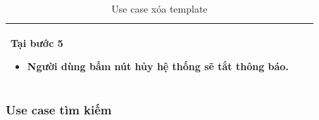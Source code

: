\documentclass[12pt,a4paper]{article}
\begin{document}
\begin{table}[H]
\begin{tabular}{|p{3.5cm}|p{11.5cm}|c|}
            Tại bước 5\newline
            \vspace{-.8cm}\begin{itemize}
                              \item Người dùng bấm nút hủy hệ thống sẽ tắt thông báo.
            \end{itemize} \\
            \hline
        \end{tabular}
        \caption{Use case xóa template  }

    \end{table}


    \subsubsection*{Use case tìm kiếm}
\end{document}

